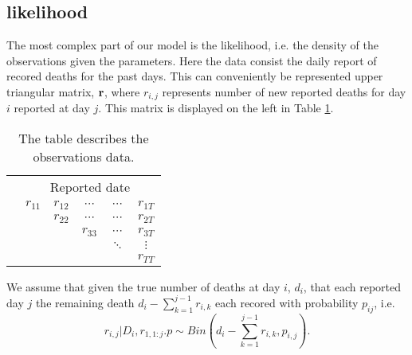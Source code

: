 \subsection{likelihood}
The most complex part of our model is the likelihood, i.e. the density of the observations given the parameters. Here the data consist the daily report of recored deaths for the past days. This can conveniently be represented upper triangular matrix, ${\boldsymbol{\mathrm{r}}}$, where $r_{i,j}$ represents number of new reported deaths for day $i$ reported at day $j$. This matrix is displayed on the left in Table \ref{tab:Data}.

\begin{table}
	\centering
	\begin{tabular}{cccccc}
		\multicolumn{1}{c}{} & \multicolumn{5}{c}{Reported date}                                             \\
		\parbox[t]{2mm}{}   & $r_{11}$ & $r_{12}$ & $\cdots$ &$\cdots$  &  $r_{1T}$\\
		& & $r_{22}$ &  $\cdots$ & $\cdots$   &$r_{2T}$ \\
		& & &$r_{33}$ &  $\cdots$ &  $r_{3T}$ \\
		& & & &  $\ddots$ & $\vdots$  \\
		& & & &  &  $r_{TT}$ \\

	\end{tabular}

	\caption{The table describes the observations data.}
	\label{tab:Data}
\end{table}

 We assume that given the true number of deaths at day $i$, $d_i$, that each reported day $j$ the remaining death $d_i - \sum_{k=1}^{j-1}r_{i,k}$ each recored with probability $p_{ij}$, i.e. $$r_{i,j}|D_i,r_{1,1:j}.p \sim Bin(d_i - \sum_{k=1}^{j-1}r_{i,k}, p_{i,j}).$$

